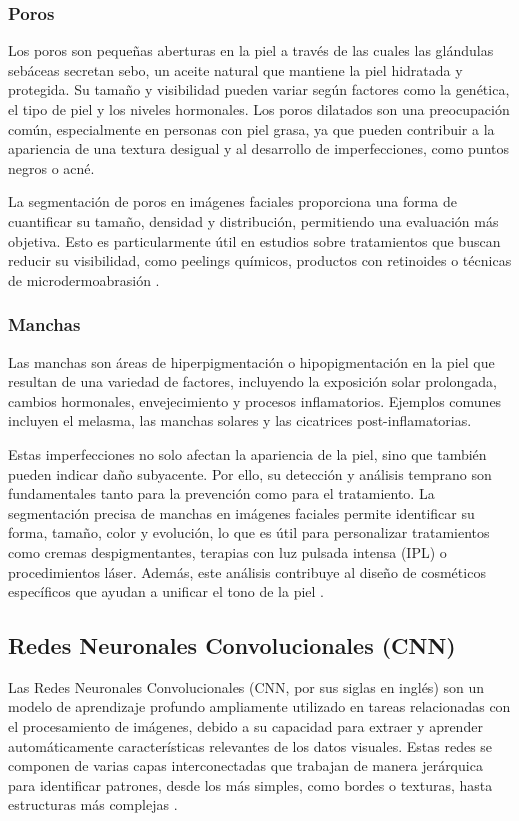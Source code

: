 \subsubsection{Poros}
Los poros son pequeñas aberturas en la piel a través de las cuales las glándulas sebáceas secretan sebo, un aceite natural que mantiene la piel hidratada y protegida. Su tamaño y visibilidad pueden variar según factores como la genética, el tipo de piel y los niveles hormonales. Los poros dilatados son una preocupación común, especialmente en personas con piel grasa, ya que pueden contribuir a la apariencia de una textura desigual y al desarrollo de imperfecciones, como puntos negros o acné.

La segmentación de poros en imágenes faciales proporciona una forma de cuantificar su tamaño, densidad y distribución, permitiendo una evaluación más objetiva. Esto es particularmente útil en estudios sobre tratamientos que buscan reducir su visibilidad, como peelings químicos, productos con retinoides o técnicas de microdermoabrasión \cite{autor2020poros}.

\subsubsection{Manchas}
Las manchas son áreas de hiperpigmentación o hipopigmentación en la piel que resultan de una variedad de factores, incluyendo la exposición solar prolongada, cambios hormonales, envejecimiento y procesos inflamatorios. Ejemplos comunes incluyen el melasma, las manchas solares y las cicatrices post-inflamatorias.

Estas imperfecciones no solo afectan la apariencia de la piel, sino que también pueden indicar daño subyacente. Por ello, su detección y análisis temprano son fundamentales tanto para la prevención como para el tratamiento. La segmentación precisa de manchas en imágenes faciales permite identificar su forma, tamaño, color y evolución, lo que es útil para personalizar tratamientos como cremas despigmentantes, terapias con luz pulsada intensa (IPL) o procedimientos láser. Además, este análisis contribuye al diseño de cosméticos específicos que ayudan a unificar el tono de la piel \cite{autor2019manchas}.
\subsection{Redes Neuronales Convolucionales (CNN)}  
Las Redes Neuronales Convolucionales (CNN, por sus siglas en inglés) son un modelo de aprendizaje profundo ampliamente utilizado en tareas relacionadas con el procesamiento de imágenes, debido a su capacidad para extraer y aprender automáticamente características relevantes de los datos visuales. Estas redes se componen de varias capas interconectadas que trabajan de manera jerárquica para identificar patrones, desde los más simples, como bordes o texturas, hasta estructuras más complejas \cite{autor2022cnn}. 


